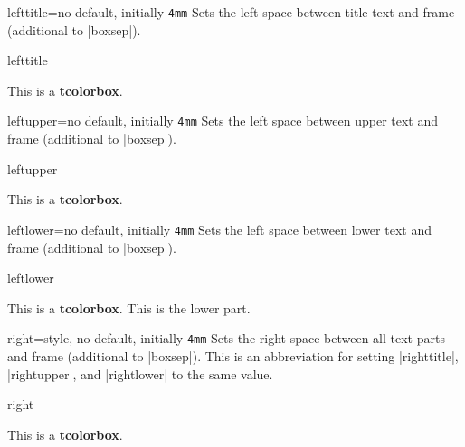\clearpage
\begin{docTcbKey}{lefttitle}{=}{no default, initially \texttt{4mm}}
  Sets the left space between title text and frame (additional to |boxsep|).
\begin{exdispExample}{lefttitle}

\begin{tcolorbox}[lefttitle=3cm,title=My Title]
This is a \textbf{tcolorbox}.
\end{tcolorbox}
\end{exdispExample}
\end{docTcbKey}


\begin{docTcbKey}{leftupper}{=}{no default, initially \texttt{4mm}}
  Sets the left space between upper text and frame (additional to |boxsep|).
\begin{exdispExample}{leftupper}

\begin{tcolorbox}[leftupper=3cm,title=My Title]
This is a \textbf{tcolorbox}.
\end{tcolorbox}
\end{exdispExample}
\end{docTcbKey}

\begin{docTcbKey}{leftlower}{=}{no default, initially \texttt{4mm}}
  Sets the left space between lower text and frame (additional to |boxsep|).
\begin{exdispExample}{leftlower}

\begin{tcolorbox}[leftlower=3cm]
This is a \textbf{tcolorbox}.
\tcblower
This is the lower part.
\end{tcolorbox}
\end{exdispExample}
\end{docTcbKey}

\enlargethispage*{1cm}

\begin{docTcbKey}{right}{=}{style, no default, initially \texttt{4mm}}
  Sets the right space between all text parts and frame (additional to |boxsep|).
  This is an abbreviation for setting
  |righttitle|, |rightupper|, and |rightlower| to the same value.
\begin{exdispExample}{right}

\begin{tcolorbox}[width=5cm,right=2cm]
This is a \textbf{tcolorbox}.
\end{tcolorbox}
\end{exdispExample}
\end{docTcbKey}

